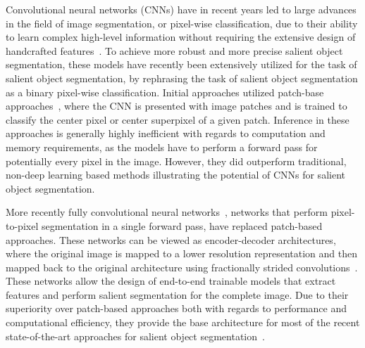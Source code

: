 \documentclass[journal]{IEEEtran}
\begin{document}
Convolutional neural networks (CNNs) have in recent years led to large advances in the field of image segmentation, or pixel-wise classification, due to their ability to learn complex high-level information without requiring the extensive design of handcrafted features~\cite{long2015fully, he2016deep}. To achieve more robust and more precise salient object segmentation, these models have recently been extensively utilized for the task of salient object segmentation, by rephrasing the task of salient object segmentation as a binary pixel-wise classification. Initial approaches utilized patch-base approaches~\cite{zhao2015saliency, li2015visual, wang2015deep}, where the CNN is presented with image patches and is trained to classify the center pixel or center superpixel of a given patch. Inference in these approaches is generally highly inefficient with regards to computation and memory requirements, as the models have to perform a forward pass for potentially every pixel in the image. However, they did outperform traditional, non-deep learning based methods illustrating the potential of CNNs for salient object segmentation. 

More recently fully convolutional neural networks~\cite{long2015fully}, networks that perform pixel-to-pixel segmentation in a single forward pass, have replaced patch-based approaches. These networks can be viewed as encoder-decoder architectures, where the original image is mapped to a lower resolution representation and then mapped back to the original architecture using fractionally strided convolutions~\cite{long2015fully}. These networks allow the design of end-to-end trainable models that extract features and perform salient segmentation for the complete image. Due to their superiority over patch-based approaches both with regards to performance and computational efficiency, they provide the base architecture for most of the recent state-of-the-art approaches for salient object segmentation~\cite{li2016deep,liu2016dhsnet,wang2016saliency}.
\end{document}
